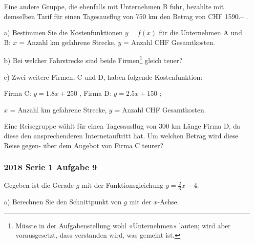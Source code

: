 Eine andere Gruppe, die ebenfalls mit Unternehmen B fuhr, bezahlte mit demselben
Tarif für einen Tagesausflug von 750 km den Betrag von CHF 1590.-- .

a) Bestimmen Sie die Kostenfunktionen $y = f(x)$ für die Unternehmen A und B;
$x$ = Anzahl km gefahrene Strecke, $y$ = Anzahl CHF Gesamtkosten.


b)  Bei welcher Fahrstrecke sind beide Firmen\footnote{Müsste in der Aufgabenstellung wohl «Unternehmen» lauten; wird aber vorausgesetzt, dass verstanden wird, was gemeint ist.} gleich teuer?

\newpage



c) 
Zwei weitere Firmen, C und D, haben folgende Kostenfunktion:

Firma C: $y = 1.8x + 250$ , Firma D: $y = 2.5x + 150$ ;

$x$ = Anzahl km gefahrene Strecke, $y$ = Anzahl CHF Gesamtkosten.

Eine Reisegruppe wählt für einen Tagesausflug von 300 km Länge Firma D, da diese
den ansprechenderen Internetauftritt hat. Um welchen Betrag wird diese Reise gegen-
über dem Angebot von Firma C teurer?

\newpage


\subsubsection{2018 Serie 1 Aufgabe 9}

Gegeben ist die Gerade $g$ mit der Funktionsgleichung $y = \frac{2}{3}x-4$.

a) Berechnen Sie den Schnittpunkt von $g$ mit der $x$-Achse.

